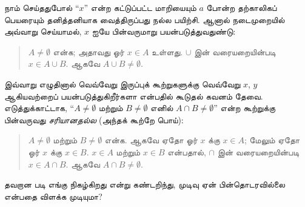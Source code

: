 \documentclass[../../../include/open-logic-section]{subfiles}
\begin{document}
நாம் செய்ததுபோல் ``$x$'' என்ற கட்டுப்பட்ட மாறியையும்
$a$ போன்ற தற்காலிகப் பெயரையும் தனித்தனியாக வைத்திருப்பது
நல்ல பயிற்சி. ஆனால் நடைமுறையில் அவ்வாறு செய்யாமல்,
$x$ ஐயே பின்வருமாறு பயன்படுத்துவதுண்டு:
\begin{quote}
$A \neq \emptyset$ என்க; அதாவது ஓர் $x \in A$
உள்ளது. $\cup$ இன் வரையறையின்படி $x \in A \cup B$.
ஆகவே $A \cup B \neq \emptyset$.
\end{quote}
இவ்வாறு எழுதினால் வெவ்வேறு இருப்புக் கூற்றுகளுக்கு
வெவ்வேறு $x$, $y$ ஆகியவற்றைப் பயன்படுத்துகிறீர்களா என்பதில்
கூடுதல் கவனம் தேவை. எடுத்துக்காட்டாக,
``$A \neq \emptyset$ மற்றும் $B \neq \emptyset$
எனில் $A \cap B \neq \emptyset$'' என்ற கூற்றுக்கு
பின்வருவது \emph{சரியானதல்ல} (அந்தக் கூற்றே பொய்):
\begin{quote}
$A \neq \emptyset$ மற்றும் $B \neq \emptyset$ என்க.
ஆகவே ஏதோ ஓர் $x$ க்கு $x \in A$; மேலும் ஏதோ
ஓர் $x$ க்கு $x \in B$. $x \in A$ மற்றும்
$x \in B$ என்பதால், $\cap$ இன் வரையறையின்படி
$x \in A \cap B$. ஆகவே $A \cap B \neq \emptyset$.
\end{quote}
தவறான படி எங்கு நிகழ்கிறது என்று கண்டறிந்து, முடிவு
ஏன் பின்தொடரவில்லை என்பதை விளக்க முடியுமா?
\end{document}
